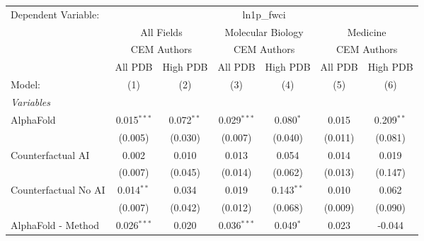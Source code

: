 \begingroup
\centering
\begin{tabular}{lcccccc}
   \tabularnewline \midrule \midrule
   Dependent Variable: & \multicolumn{6}{c}{ln1p\_fwci}\\
 & \multicolumn{2}{c}{All Fields} & \multicolumn{2}{c}{Molecular Biology} & \multicolumn{2}{c}{Medicine} \\
\cmidrule(lr){2-3} \cmidrule(lr){4-5} \cmidrule(lr){6-7}
 & \multicolumn{2}{c}{CEM Authors} & \multicolumn{2}{c}{CEM Authors} & \multicolumn{2}{c}{CEM Authors} \\
\cmidrule(lr){2-3} \cmidrule(lr){4-5} \cmidrule(lr){6-7}
 & \multicolumn{1}{c}{All PDB} & \multicolumn{1}{c}{High PDB} & \multicolumn{1}{c}{All PDB} & \multicolumn{1}{c}{High PDB} & \multicolumn{1}{c}{All PDB} & \multicolumn{1}{c}{High PDB} \\
\cmidrule(lr){2-2} \cmidrule(lr){3-3} \cmidrule(lr){4-4} \cmidrule(lr){5-5} \cmidrule(lr){6-6} \cmidrule(lr){7-7}
   Model:                                                     & (1)            & (2)           & (3)           & (4)          & (5)            & (6)\\  
   \midrule
   \emph{Variables}\\
   AlphaFold                                                  & 0.015$^{***}$  & 0.072$^{**}$  & 0.029$^{***}$ & 0.080$^{*}$  & 0.015          & 0.209$^{**}$\\   
                                                              & (0.005)        & (0.030)       & (0.007)       & (0.040)      & (0.011)        & (0.081)\\   
   Counterfactual AI                                          & 0.002          & 0.010         & 0.013         & 0.054        & 0.014          & 0.019\\   
                                                              & (0.007)        & (0.045)       & (0.014)       & (0.062)      & (0.013)        & (0.147)\\   
   Counterfactual No AI                                       & 0.014$^{**}$   & 0.034         & 0.019         & 0.143$^{**}$ & 0.010          & 0.062\\   
                                                              & (0.007)        & (0.042)       & (0.012)       & (0.068)      & (0.009)        & (0.090)\\   
   AlphaFold - Method                                         & 0.026$^{***}$  & 0.020         & 0.036$^{***}$ & 0.049$^{*}$  & 0.023          & -0.044\\   

\end{tabular}
